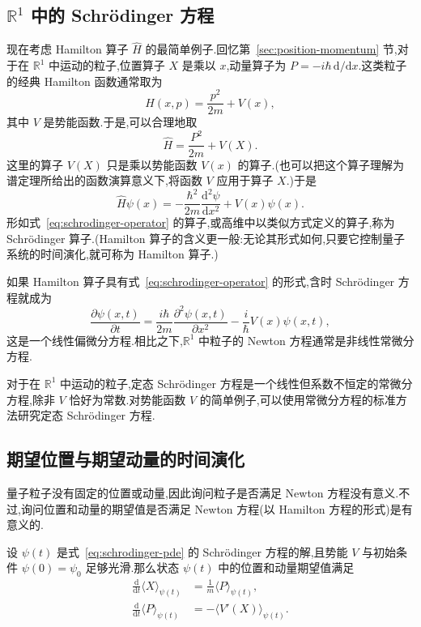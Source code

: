\subsection{\(\mathbb{R}^{1}\) 中的 Schrödinger 方程}\label{subsec:schrodinger-operator}

现在考虑 Hamilton 算子 \(\widehat H\) 的最简单例子.回忆第~\ref{sec:position-momentum} 节,对于在 \(\mathbb{R}^{1}\) 中运动的粒子,位置算子 \(X\) 是乘以 \(x\),动量算子为 \(P=-i\hbar\,\mathrm{d}/\mathrm{d}x\).这类粒子的经典 Hamilton 函数通常取为
\[
H(x,p)=\frac{p^{2}}{2m}+V(x),
\]
其中 \(V\) 是势能函数.于是,可以合理地取
\[
\widehat H=\frac{P^{2}}{2m}+V(X).
\]
这里的算子 \(V(X)\) 只是乘以势能函数 \(V(x)\) 的算子.(也可以把这个算子理解为谱定理所给出的函数演算意义下,将函数 \(V\) 应用于算子 \(X\).)于是
\begin{equation}
\widehat H\psi(x)=-\frac{\hbar^{2}}{2m}\frac{\mathrm{d}^{2}\psi}{\mathrm{d}x^{2}}+V(x)\psi(x).
\label{eq:schrodinger-operator}
\end{equation}
形如式~\eqref{eq:schrodinger-operator} 的算子,或高维中以类似方式定义的算子,称为 Schrödinger 算子.(Hamilton 算子的含义更一般:无论其形式如何,只要它控制量子系统的时间演化,就可称为 Hamilton 算子.)

如果 Hamilton 算子具有式~\eqref{eq:schrodinger-operator} 的形式,含时 Schrödinger 方程就成为
\begin{equation}
\frac{\partial\psi(x,t)}{\partial t}
=\frac{i\hbar}{2m}\frac{\partial^{2}\psi(x,t)}{\partial x^{2}}
-\frac{i}{\hbar}V(x)\psi(x,t),
\label{eq:schrodinger-pde}
\end{equation}
这是一个线性偏微分方程.相比之下,\(\mathbb{R}^{1}\) 中粒子的 Newton 方程通常是非线性常微分方程.

对于在 \(\mathbb{R}^{1}\) 中运动的粒子,定态 Schrödinger 方程是一个线性但系数不恒定的常微分方程,除非 \(V\) 恰好为常数.对势能函数 \(V\) 的简单例子,可以使用常微分方程的标准方法研究定态 Schrödinger 方程.

\subsection{期望位置与期望动量的时间演化}\label{subsec:expected-position-momentum}

量子粒子没有固定的位置或动量,因此询问粒子是否满足 Newton 方程没有意义.不过,询问位置和动量的期望值是否满足 Newton 方程(以 Hamilton 方程的形式)是有意义的.

\begin{proposition}[期望位置与期望动量的演化]\label{prop:expected-position-momentum}
设 \(\psi(t)\) 是式~\eqref{eq:schrodinger-pde} 的 Schrödinger 方程的解,且势能 \(V\) 与初始条件 \(\psi(0)=\psi_{0}\) 足够光滑.那么状态 \(\psi(t)\) 中的位置和动量期望值满足
\begin{align}
\frac{\mathrm{d}}{\mathrm{d}t}\langle X\rangle_{\psi(t)}
&=\frac{1}{m}\langle P\rangle_{\psi(t)},\label{eq:expected-position-evolution}\\
\frac{\mathrm{d}}{\mathrm{d}t}\langle P\rangle_{\psi(t)}
&=-\langle V'(X)\rangle_{\psi(t)}.\label{eq:expected-momentum-evolution}
\end{align}
\end{proposition}


